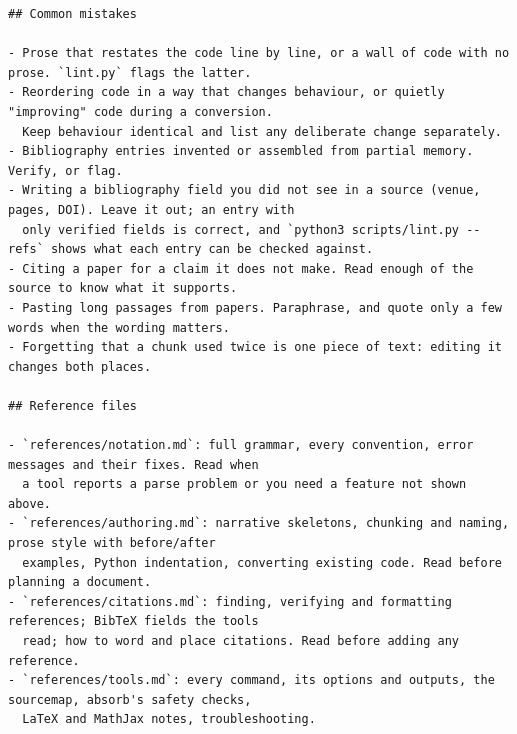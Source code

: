 \documentclass[10pt,a4paper]{article}
\newcounter{chunk}
\begin{document}
\begin{Verbatim}
## Common mistakes

- Prose that restates the code line by line, or a wall of code with no prose. `lint.py` flags the latter.
- Reordering code in a way that changes behaviour, or quietly "improving" code during a conversion.
  Keep behaviour identical and list any deliberate change separately.
- Bibliography entries invented or assembled from partial memory. Verify, or flag.
- Writing a bibliography field you did not see in a source (venue, pages, DOI). Leave it out; an entry with
  only verified fields is correct, and `python3 scripts/lint.py --refs` shows what each entry can be checked against.
- Citing a paper for a claim it does not make. Read enough of the source to know what it supports.
- Pasting long passages from papers. Paraphrase, and quote only a few words when the wording matters.
- Forgetting that a chunk used twice is one piece of text: editing it changes both places.

## Reference files

- `references/notation.md`: full grammar, every convention, error messages and their fixes. Read when
  a tool reports a parse problem or you need a feature not shown above.
- `references/authoring.md`: narrative skeletons, chunking and naming, prose style with before/after
  examples, Python indentation, converting existing code. Read before planning a document.
- `references/citations.md`: finding, verifying and formatting references; BibTeX fields the tools
  read; how to word and place citations. Read before adding any reference.
- `references/tools.md`: every command, its options and outputs, the sourcemap, absorb's safety checks,
  LaTeX and MathJax notes, troubleshooting.
\end{Verbatim}
\end{document}
